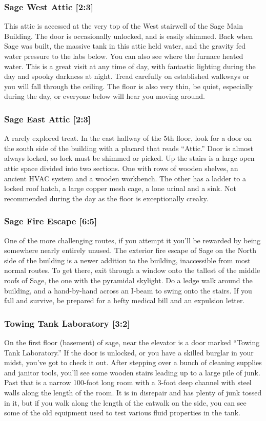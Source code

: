 \documentclass{article}
\begin{document}
\subsubsection{Sage West Attic [2:3]}
This attic is accessed at the very top of the West stairwell of the Sage Main Building. The door is occasionally unlocked, and is easily shimmed. Back when Sage was built, the massive tank in this attic held water, and the gravity fed water pressure to the labs below. You can also see where the furnace heated water. This is a great visit at any time of day, with fantastic lighting during the day and spooky darkness at night. Tread carefully on established walkways or you will fall through the ceiling. The floor is also very thin, be quiet, especially during the day, or everyone below will hear you moving around.
\subsubsection{Sage East Attic [2:3]}
A rarely explored treat. In the east hallway of the 5th floor, look for a door on the south side of the building with a placard that reads “Attic.” Door is almost always locked, so lock must be shimmed or picked. Up the stairs is a large open attic space divided into two sections. One with rows of wooden shelves, an ancient HVAC system and a wooden workbench. The other has a ladder to a locked roof hatch, a large copper mesh cage, a lone urinal and a sink. Not recommended during the day as the floor is exceptionally creaky.

 \subsubsection{Sage Fire Escape [6:5]}
One of the more challenging routes, if you attempt it you’ll be rewarded by being somewhere nearly entirely unused. The exterior fire escape of Sage on the North side of the building is a newer addition to the building, inaccessible from most normal routes. To get there, exit through a window onto the tallest of the middle roofs of Sage, the one with the pyramidal skylight. Do a ledge walk around the building, and a hand-by-hand across an I-beam to swing onto the stairs. If you fall and survive, be prepared for a hefty medical bill and an expulsion letter.
\subsubsection{Towing Tank Laboratory [3:2]}
On the first floor (basement) of sage, near the elevator is a door marked “Towing Tank Laboratory.” If the door is unlocked, or you have a skilled burglar in your midst, you’ve got to check it out. After stepping over a bunch of cleaning supplies and janitor tools, you’ll see some wooden stairs leading up to a large pile of junk. Past that is a narrow 100-foot long room with a 3-foot deep channel with steel walls along the length of the room. It is in disrepair and has plenty of junk tossed in it, but if you walk along the length of the catwalk on the side, you can see some of the old equipment used to test various fluid properties in the tank.
\end{document}
